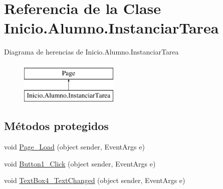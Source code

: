 \hypertarget{classInicio_1_1Alumno_1_1InstanciarTarea}{}\section{Referencia de la Clase Inicio.\+Alumno.\+Instanciar\+Tarea}
\label{classInicio_1_1Alumno_1_1InstanciarTarea}
Diagrama de herencias de Inicio.\+Alumno.\+Instanciar\+Tarea\begin{figure}[H]
\begin{center}
\leavevmode
\includegraphics[height=2.000000cm]{classInicio_1_1Alumno_1_1InstanciarTarea}
\end{center}
\end{figure}
\subsection*{Métodos protegidos}
\begin{DoxyCompactItemize}
\item 
void \mbox{\hyperlink{classInicio_1_1Alumno_1_1InstanciarTarea_a1a7582b555d2fd8e26ddb35260619463}{Page\+\_\+\+Load}} (object sender, Event\+Args e)
\item 
void \mbox{\hyperlink{classInicio_1_1Alumno_1_1InstanciarTarea_acc66a1f6cd785abeb08a0bb7d80b0d94}{Button1\+\_\+\+Click}} (object sender, Event\+Args e)
\item 
void \mbox{\hyperlink{classInicio_1_1Alumno_1_1InstanciarTarea_af8be8d59a93893e7cb87fc71c5761489}{Text\+Box4\+\_\+\+Text\+Changed}} (object sender, Event\+Args e)
\end{DoxyCompactItemize}
